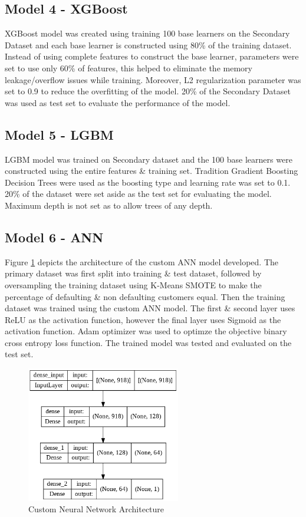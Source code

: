 \documentclass[twoside,11pt,a4paper]{article}
\begin{document}
\subsection{Model 4 - \acf{XGBoost}}
\acs{XGBoost} model was created using training 100 base learners on the Secondary Dataset and each base learner is constructed using 80\% of the training dataset. Instead of using complete features to construct the base learner, parameters were set to use only 60\% of features, this helped to eliminate the memory leakage/overflow issues while training. Moreover, L2 regularization parameter was set to 0.9 to reduce the overfitting of the model. 20\% of the Secondary Dataset was used as test set to evaluate the performance of the model.

\subsection{Model 5 - \acf{LGBM}}
\acs{LGBM} model was trained on Secondary dataset and the 100 base learners were constructed using the entire features \& training set. Tradition Gradient Boosting Decision Trees were used as the boosting type and learning rate was set to 0.1. 20\% of the dataset were set aside as the test set for evaluating the model. Maximum depth is not set as to allow trees of any depth. 

\subsection{Model 6 - \acf{ANN}}
Figure \ref{fig:nn_arch} depicts the architecture of the custom \acs{ANN} model developed.  The primary dataset was first split into training \& test dataset, followed by oversampling the training dataset using K-Means \acs{SMOTE} to make the percentage of defaulting \& non defaulting customers equal. Then the training dataset was trained using the custom \acs{ANN} model. The first \& second layer uses \acf{ReLU} as the activation function, however the final layer uses Sigmoid as the activation function. Adam optimizer was used to optimze the objective binary cross entropy loss function. The trained model was tested and evaluated on the test set.\\
\begin{figure}[ht]
	\centering
	\includegraphics[width=0.6\textwidth, height=0.3\textheight]{nn_arch}
	\caption[Custom Neural Network Architecture]{Custom Neural Network Architecture}
	\label{fig:nn_arch}
\end{figure}
\FloatBarrier
\end{document}
